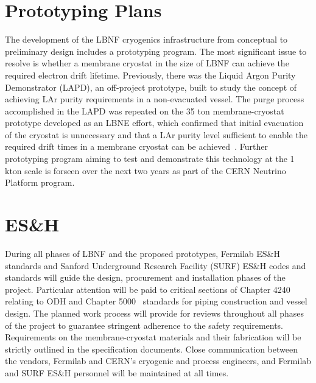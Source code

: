 


\chapter{Prototyping Plans}
\label{sec:cryo-cryosys-proto-plans}


The development of the LBNF cryogenics infrastructure from conceptual 
to preliminary design includes a prototyping program. The most 
significant issue to resolve is whether a membrane cryostat in
the size of LBNF can achieve the required electron drift lifetime. 
Previously, there was the Liquid Argon Purity Demonstrator (LAPD), an 
off-project prototype, built to study the concept of achieving
LAr purity requirements in a non-evacuated vessel. 
The purge process accomplished in the LAPD was 
repeated on the 35 ton membrane-cryostat prototype 
developed as an LBNE effort, which confirmed that initial 
evacuation of the cryostat is unnecessary and that 
a LAr purity level sufficient to enable the required 
drift times in a membrane cryostat can be achieved~\cite{Montanari:2013/06/13aqa}.
Further prototyping program aiming to test and demonstrate 
this technology at the 1 kton scale is forseen over the
next two years as part of the CERN Neutrino Platform program.

\chapter{ES\&H}
\label{sec:cryo-cryosys-esh}

During all phases of LBNF and the proposed prototypes, 
Fermilab ES\&H standards and Sanford Underground Research 
Facility (SURF) ES\&H codes and standards will guide the design, 
procurement and installation phases of the project. Particular 
attention will be paid to critical sections of
Chapter 4240~\cite{feshm} relating to ODH and 
Chapter 5000~\cite{feshm} standards for 
piping construction and vessel design. The planned 
work process will provide for reviews throughout all 
phases of the project to guarantee stringent adherence 
to the safety requirements. Requirements on the membrane-cryostat
materials and their fabrication will be strictly outlined in the 
specification documents. Close communication between the vendors, 
Fermilab and CERN's cryogenic and process engineers, and Fermilab and 
SURF ES\&H personnel will be maintained at all times.

